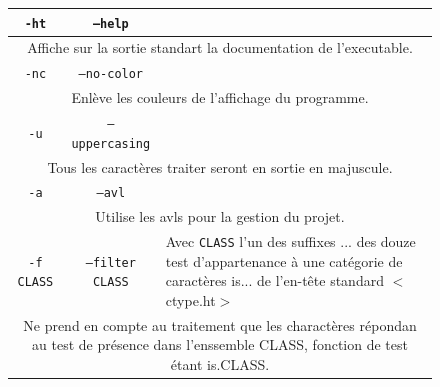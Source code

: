 \documentclass[12pt]{article}
\begin{document}
    \begin{figure}[!htbp]
        \centering
        
        
        \label{exemple-ex}
    \end{figure}

    \begin{figure}[t]
        \centering
          \begin{tabularx}{\textwidth}{|c|c|X|}
            \hline
                \multirow{1}{*}{\cellcolor{blue-s!25}\texttt{-ht}} & \multirow{1}{*}{\cellcolor{blue-s!15}\texttt{--help}} & \cellcolor{blue-t!70}\\
            \hline
                \multicolumn{3}{|c|}{\cellcolor{blue-u!7}Affiche sur la sortie standart la documentation de l'executable.}\\[0.5em]
            \hline
                \multirow{1}{*}{\cellcolor{blue-s!25}\texttt{-nc}} & \multirow{1}{*}{\cellcolor{blue-s!25}\texttt{--no-color}} & \cellcolor{blue-t!70}\\
            \hline
                \multicolumn{3}{|c|}{\cellcolor{blue-u!7}Enlève les couleurs de l'affichage du programme.}\\[0.5em]
            \hline
                \multirow{1}{*}{\cellcolor{blue-s!25}\texttt{-u}} & \multirow{1}{*}{\cellcolor{blue-s!25}\texttt{--uppercasing}} & \cellcolor{blue-t!70}\\
            \hline
                \multicolumn{3}{|c|}{\cellcolor{blue-u!7}Tous les caractères traiter seront en sortie en majuscule.}\\[0.5em]
            \hline
                \multirow{1}{*}{\cellcolor{blue-s!25}\texttt{-a}} & \multirow{1}{*}{\cellcolor{blue-s!25}\texttt{--avl}} & \cellcolor{blue-t!70}\\
            \hline
                \multicolumn{3}{|c|}{\cellcolor{blue-u!7}Utilise les avls pour la gestion du projet.}\\[0.5em]
            \hline
                \cellcolor{blue-s!25}\texttt{-f CLASS} & \cellcolor{blue-s!25}\texttt{--filter CLASS} & \rule{0pt}{2.6em}\cellcolor{blue-s!25}{\parbox{9cm}{ Avec \texttt{CLASS} l’un des suffixes ... des douze test\\ d’appartenance à une catégorie de caractères is... de l’en-tête standard $<$ctype.ht$>$}}\\[1.3em]
            \hline
                \multicolumn{3}{|c|}{\cellcolor{blue-u!7}\rule{0pt}{2em}\parbox{15cm}{Ne prend en compte au traitement que les charactères répondan au test  de présence dans l'enssemble CLASS, fonction de test étant is.CLASS.}}\\[1em]

\end{tabularx}
\end{figure}
\end{document}

